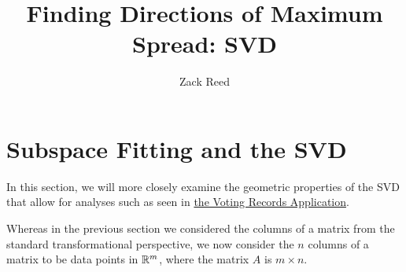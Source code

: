 \documentclass{ximera}
\author{Zack Reed}
\title{Finding Directions of Maximum Spread: SVD}
\begin{document}
\begin{abstract}

\end{abstract}
\maketitle


\section{Subspace Fitting and the SVD}


In this section, we will more closely examine the geometric properties of the SVD that allow for analyses such as seen in \href{https://ximera.osu.edu/appliedlinearalgebra/c6ChapterSix/learningActivities/m6LearningActivities/leastSquares/leastSquaresApplicationVotingImages}{the Voting Records Application}.

Whereas in the previous section we considered the columns of a matrix from the standard transformational perspective, we now consider the $n$ columns of a matrix to be data points in $\mathbb{R}^m$, where the matrix $A$ is $m\times n$. 
\end{document}
